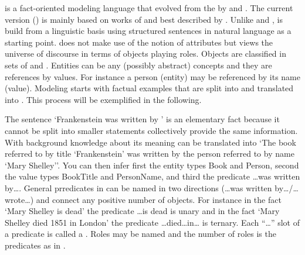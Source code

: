  is a fact-oriented modeling language that
evolved from the  by
 and 
\cite{Nijssen1989,Falkenberg1976}. The current version () is mainly
based on works of  and best described by
\textcite{Halpin2008}. Unlike  and ,  is build
from a linguistic basis using structured sentences in natural language as a
starting point.  does not make use of the notion of attributes but
views the universe of discourse in terms of objects playing roles.  Objects are
classified in sets of  and . Entities can be any (possibly abstract) concepts and
they are references by values. For instance a person (entity) may be referenced
by its name (value). Modeling starts with factual examples that are split into
 and translated into
.  This process will be exemplified in the
following.

The sentence `Frankenstein was written by ' is an
elementary fact because it cannot be split into smaller statements collectively
provide the same information. With background knowledge about its meaning can
be translated into `The book referred to by title `Frankenstein' was written by
the person referred to by name `Mary Shelley'{}'.  You can then infer first the
entity types {\ormtext Book} and {\ormtext Person}, second the value types
{\ormtext BookTitle} and {\ormtext PersonName}, and third the predicate
{\ormtext \ldots was written by\ldots}.  General prredicates in  can
be named in two directions ({\ormtext \ldots was written by\ldots /\ldots
wrote\ldots}) and connect any positive number of objects. For instance in the
fact `Mary Shelley is dead' the predicate {\ormtext \ldots is dead} is unary
and in the fact `Mary Shelley died 1851 in London' the predicate
{\ormtext\ldots died\ldots in\ldots} is ternary. Each ``{\ormtext \ldots}''
slot of a predicate is called a . Roles may be named
and the number of roles is the predicates  as in . 


